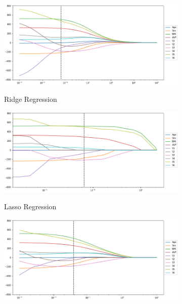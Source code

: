 \begin{figure}
\centering
	\begin{subfigure}{0.9\textwidth}
	\centering
	\includegraphics[width = \textwidth]{figures/ridge_regression_coefficients_cv.png}
	\label{ridge_regression_coefficients}
	\vspace{-0.5cm}
	\caption{Ridge Regression}
	\vspace{0.5cm}
	\end{subfigure}
	\begin{subfigure}{0.9\textwidth}
	\centering
	\includegraphics[width = \textwidth]{figures/lasso_regression_coefficients_cv.png}
	\label{lasso_regression_coefficients}
	\vspace{-0.5cm}
	\caption{Lasso Regression}
	\vspace{0.5cm}
	\end{subfigure}
	\begin{subfigure}{0.9\textwidth}
	\centering
	\includegraphics[width = \textwidth]{figures/elastic_net_coefficients_cv.png}

\end{subfigure}
\end{figure}
